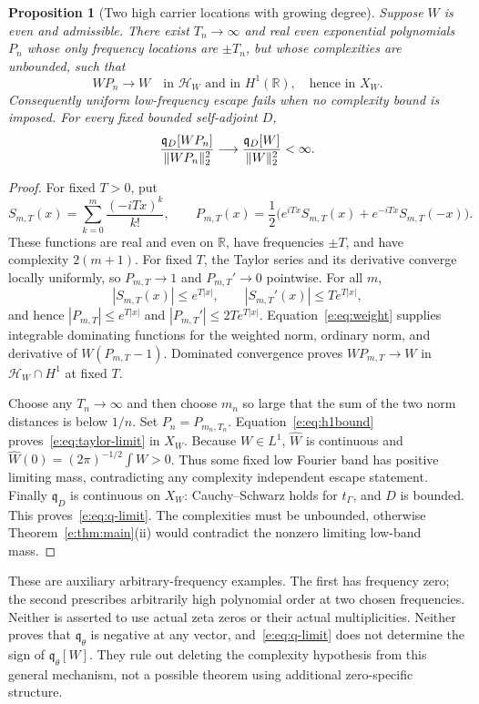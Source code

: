 \documentclass[11pt,a4paper]{article}
\numberwithin{equation}{section}
\newtheorem{proposition}[theorem]{Proposition}
\theoremstyle{definition}\newtheorem{definition}[theorem]{Definition}
\theoremstyle{remark}\newtheorem{remark}[theorem]{Remark}
\newcommand{\R}{\mathbb R}\newcommand{\C}{\mathbb C}\newcommand{\N}{\mathbb N}
\newcommand{\HH}{\mathcal H_W}\newcommand{\XX}{X_W}\newcommand{\EE}{\mathcal E_{N,\beta}}
\newcommand{\tg}{t_\Gamma}\newcommand{\cg}{c_\Gamma}
\newcommand{\qD}{\mathfrak q_D}\newcommand{\qth}{\mathfrak q_\theta}
\begin{document}
\begin{proposition}[Two high carrier locations with growing degree]\label{e:prop:escape-counter}
Suppose $W$ is even and admissible. There exist $T_n\to\infty$ and real
even exponential polynomials $P_n$ whose only frequency locations are
$\pm T_n$, but whose complexities are unbounded, such that
\begin{equation}\label{e:eq:taylor-limit}
 WP_n\longrightarrow W\quad\text{in }\HH\text{ and in }H^1(\R),
 \quad\text{hence in }\XX.
\end{equation}
Consequently uniform low-frequency escape fails when no complexity bound
is imposed. For every fixed bounded self-adjoint $D$,
\begin{equation}\label{e:eq:q-limit}
 \frac{\qD[WP_n]}{\norm{WP_n}_2^2}
 \longrightarrow\frac{\qD[W]}{\norm W_2^2}<\infty.
\end{equation}
\end{proposition}
\begin{proof}
For fixed $T>0$, put
\[
 S_{m,T}(x)=\sum_{k=0}^m\frac{(-iTx)^k}{k!},\qquad
 P_{m,T}(x)=\frac12\bigl(e^{iTx}S_{m,T}(x)
 +e^{-iTx}S_{m,T}(-x)\bigr).
\]
These functions are real and even on $\R$, have frequencies $\pm T$, and
have complexity $2(m+1)$. For fixed $T$, the Taylor series and its derivative
converge locally uniformly, so $P_{m,T}\to1$ and $P_{m,T}'\to0$ pointwise.
For all $m$,
\[
 |S_{m,T}(x)|\le e^{T|x|},\qquad
 |S_{m,T}'(x)|\le T e^{T|x|},
\]
and hence $|P_{m,T}|\le e^{T|x|}$ and
$|P_{m,T}'|\le2T e^{T|x|}$. Equation~\eqref{e:eq:weight} supplies integrable
dominating functions for the weighted norm, ordinary norm, and derivative
of $W(P_{m,T}-1)$. Dominated convergence proves
$WP_{m,T}\to W$ in $\HH\cap H^1$ at fixed $T$.

Choose any $T_n\to\infty$ and then choose $m_n$ so large that the sum of
the two norm distances is below $1/n$. Set $P_n=P_{m_n,T_n}$.
Equation~\eqref{e:eq:h1bound} proves~\eqref{e:eq:taylor-limit} in $\XX$.
Because $W\in L^1$, $\widehat W$ is continuous and
$\widehat W(0)=(2\pi)^{-1/2}\int W>0$.
Thus some fixed low Fourier band has positive limiting mass, contradicting
any complexity independent escape statement. Finally $\qD$ is continuous
on $\XX$: Cauchy--Schwarz holds for $\tg$, and $D$ is bounded.
This proves~\eqref{e:eq:q-limit}. The complexities must be unbounded,
otherwise Theorem~\ref{e:thm:main}\textup{(ii)} would contradict the
nonzero limiting low-band mass.
\end{proof}

These are auxiliary arbitrary-frequency examples. The first has frequency
zero; the second prescribes arbitrarily high polynomial order at two
chosen frequencies. Neither is asserted to use actual zeta zeros or their
actual multiplicities. Neither proves that $\qth$ is negative at any
vector, and~\eqref{e:eq:q-limit} does not determine the sign of $\qth[W]$.
They rule out deleting the complexity hypothesis from this general
mechanism, not a possible theorem using additional zero-specific structure.
\end{document}
